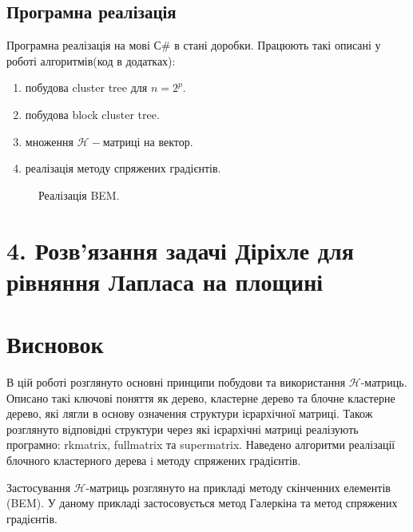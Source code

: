 \documentclass[12pt]{report}
\begin{document}
	\section{Програмна реалізація}
	\hspace{0.8cm} Програмна реалізація на мові $С\#$ в стані доробки. Працюють такі описані у роботі алгоритмів(код в додатках):
		 \begin{enumerate}
		 	\item побудова cluster tree для $n=2^p$.
		 	\item побудова block cluster tree.
		 	\item множення $\mathcal{H}-$матриці на вектор.
		 	\item реалізація методу спряжених градієнтів.
		 \end{enumerate}
	\begin{figure}[bh]
			\caption{Реалізація BEM.}	 
			\end{figure}
	\chapter{4. Розв'язання задачі Діріхле для рівняння Лапласа на площині}
	\chapter{Висновок}
	\hspace{0.8cm} В цій роботі розглянуто основні принципи побудови та використання $\mathcal{H}$-матриць. Описано такі ключові поняття як дерево, кластерне дерево та блочне кластерне дерево, які лягли в основу означення структури ієрархічної матриці. Також розглянуто відповідні структури через які ієрархічні матриці реалізують програмно: rkmatrix, fullmatrix та supermatrix. Наведено алгоритми реалізації блочного кластерного дерева i методу спряжених градієнтів.
	\par Застосування $\mathcal{H}$-матриць розглянуто на прикладі методу скінченних елементів (BEM). У даному прикладі застосовується метод Галеркіна та метод спряжених градієнтів. 
\end{document}
